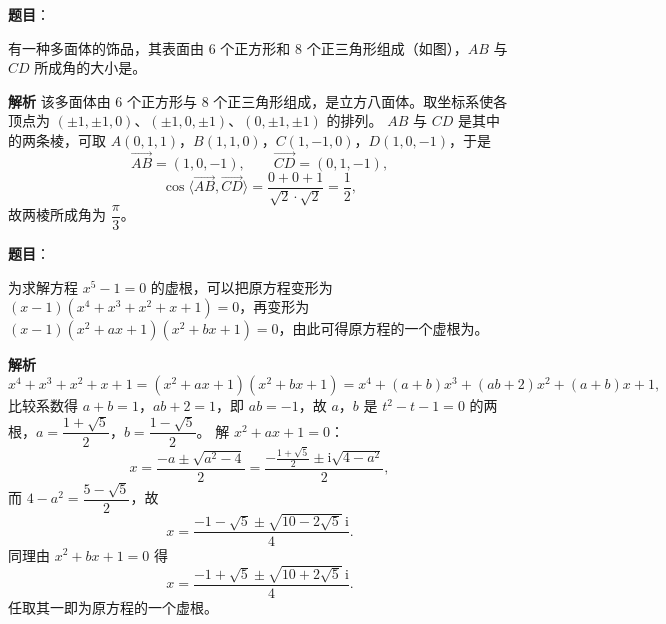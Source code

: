 \begin{answer}

\textbf{题目}：

有一种多面体的饰品，其表面由 6 个正方形和 8 个正三角形组成（如图），$AB$ 与 $CD$ 所成角的大小是\gkblank{}。
\nopagebreak[4]
\begin{center}\end{center}
\nopagebreak[4]
\textbf{解析}
该多面体由 $6$ 个正方形与 $8$ 个正三角形组成，是立方八面体。取坐标系使各顶点为 $(\pm1,\pm1,0)$、$(\pm1,0,\pm1)$、$(0,\pm1,\pm1)$ 的排列。
$AB$ 与 $CD$ 是其中的两条棱，可取 $A(0,1,1)$，$B(1,1,0)$，$C(1,-1,0)$，$D(1,0,-1)$，于是
\nopagebreak[4]
\[\overrightarrow{AB}=(1,0,-1),\qquad\overrightarrow{CD}=(0,1,-1),\]
\nopagebreak[4]
\[\cos\langle\overrightarrow{AB},\overrightarrow{CD}\rangle=\frac{0+0+1}{\sqrt2\cdot\sqrt2}=\frac12,\]
故两棱所成角为 $\dfrac\pi3$。


\end{answer}
\begin{answer}

\textbf{题目}：

为求解方程 $x^5-1=0$ 的虚根，可以把原方程变形为 $(x-1)(x^4+x^3+x^2+x+1)=0$，再变形为 $(x-1)(x^2+ax+1)(x^2+bx+1)=0$，由此可得原方程的一个虚根为\gkblank{}。

\textbf{解析}
\nopagebreak[4]
\[x^4+x^3+x^2+x+1=(x^2+ax+1)(x^2+bx+1)=x^4+(a+b)x^3+(ab+2)x^2+(a+b)x+1,\]
比较系数得 $a+b=1$，$ab+2=1$，即 $ab=-1$，故 $a$，$b$ 是 $t^2-t-1=0$ 的两根，$a=\dfrac{1+\sqrt5}2$，$b=\dfrac{1-\sqrt5}2$。
解 $x^2+ax+1=0$：
\nopagebreak[4]
\[x=\frac{-a\pm\sqrt{a^2-4}}2=\frac{-\frac{1+\sqrt5}2\pm\mathrm i\sqrt{4-a^2}}2,\]
而 $4-a^2=\dfrac{5-\sqrt5}2$，故
\nopagebreak[4]
\[x=\frac{-1-\sqrt5\pm\sqrt{10-2\sqrt5}\,\mathrm i}4.\]
同理由 $x^2+bx+1=0$ 得
\nopagebreak[4]
\[x=\frac{-1+\sqrt5\pm\sqrt{10+2\sqrt5}\,\mathrm i}4.\]
任取其一即为原方程的一个虚根。


\end{answer}
